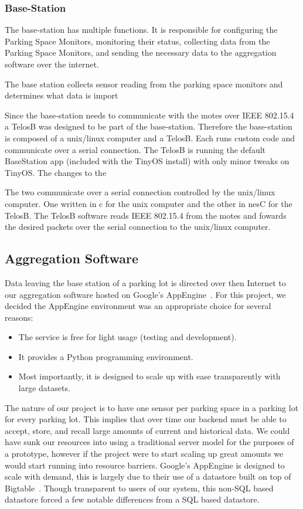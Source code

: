 \documentclass{acm_proc}
\begin{document}
\subsubsection{Base-Station}

The base-station has multiple functions.  It is responsible for configuring the Parking Space Monitors, monitoring their status, collecting data from the Parking Space Monitors, and sending the necessary data to the aggregation software over the internet.

The base station collects sensor reading from the parking space monitors and determines what data is import

Since the base-station needs to communicate with the motes over IEEE 802.15.4 a TelosB was designed to be part of the base-station.  Therefore the base-station is composed of a unix/linux computer and a TelosB.  Each runs custom code and communicate over a serial connection.  The TelosB is running the default BaseStation app (included with the TinyOS install) with only minor tweaks on TinyOS.  The changes to the 

 The two communicate over a serial connection controlled by the unix/linux computer.  One written in c for the unix computer and the other in nesC for the TelosB.  The TelosB software reads IEEE 802.15.4 from the motes and fowards the desired packets over the serial connection to the unix/linux computer.

\subsection{Aggregation Software}

Data leaving the base station of a parking lot is directed over then
Internet to our aggregation software hosted on Google's
AppEngine~\cite{google:appengine}.
For this project, we decided the AppEngine environment was an appropriate
choice for several reasons:
\begin{itemize}
	\item The service is free for light usage (testing and development).
	\item It provides a Python programming environment.
	\item Most importantly, it is designed to scale up with ease
	transparently with large datasets.
\end{itemize}

The nature of our project is to have one sensor per parking space in a
parking lot for every parking lot.
This implies that over time our backend must be able to accept, store, and
recall large amounts of current and historical data.
We could have sunk our resources into using a traditional server model for
the purposes of a prototype, however if the project were to start scaling
up great amounts we would start running into resource barriers.
Google's AppEngine is designed to scale with demand, this is largely due to
their use of a datastore built on top of Bigtable~\cite{google:bigtable}.
Though transparent to users of our system, this non-SQL based datastore
forced a few notable differences from a SQL based datastore.
\end{document}
